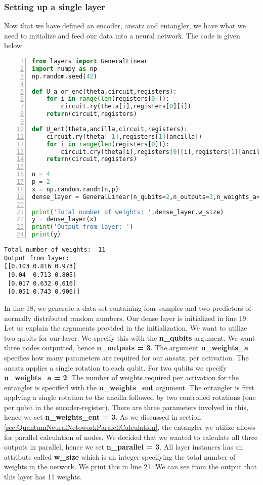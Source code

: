 \subsubsection{Setting up a single layer}
\label{subsubsec:MEthodsSettingUpLayer}
Now that we have defined an encoder, ansatz and entangler, we have what we need to initialize and feed our data into a neural network. The code is given below
\begin{lstlisting}[language=Python,numbers=left]
from layers import GeneralLinear
import numpy as np
np.random.seed(42)

def U_a_or_enc(theta,circuit,registers):
    for i in range(len(registers[0])):
        circuit.ry(theta[i],registers[0][i])
    return(circuit,registers)
    
def U_ent(theta,ancilla,circuit,registers):
    circuit.ry(theta[-1],registers[1][ancilla])
    for i in range(len(registers[0])):
        circuit.cry(theta[i],registers[0][i],registers[1][ancilla])
    return(circuit,registers)

n = 4
p = 2
x = np.random.randn(n,p)
dense_layer = GeneralLinear(n_qubits=2,n_outputs=3,n_weights_a=2,n_weights_ent=3,U_enc=U_a_or_enc,U_a = U_a_or_enc, U_ent=U_ent,n_parallel= 3,seed_simulator=42)

print('Total number of weights: ',dense_layer.w_size)
y = dense_layer(x)
print('Output from layer: ')
print(y)
\end{lstlisting}
\begin{verbatim}
Total number of weights:  11
Output from layer: 
[[0.103 0.816 0.973]
 [0.04  0.713 0.805]
 [0.017 0.632 0.616]
 [0.051 0.743 0.906]]
\end{verbatim}
In line 18, we generate a data set containing four samples and two predictors of normally distributed random numbers. Our dense layer is initialized in line 19. Let us explain the arguments provided in the initialization. We want to utilize two qubits for our layer. We specify this with the \textbf{n\_qubits} argument. We want three nodes outputted, hence \textbf{n\_outputs = 3}. The argument \textbf{n\_weights\_a} specifies how many parameters are required for our ansatz, per activation. The ansatz applies a single rotation to each qubit. For two qubits we specify \textbf{n\_weights\_a = 2}. The number of weights required per activation for the entangler is specified with the \textbf{n\_weights\_ent} argument. The entangler is first applying a single rotation to the ancilla followed by two controlled rotations (one per qubit in the encoder-register). There are three parameters involved in this, hence we set \textbf{n\_weights\_ent = 3}. As we discussed in section \ref{sec:QuantumNeuralNetoworkParalellCalculation}, the entangler we utilize allows for parallel calculation of nodes. We decided that we wanted to calculate all three outputs in parallel, hence we set \textbf{n\_parallel = 3}.
All layer instances has an attribute called \textbf{w\_size} which is an integer specifying the total number of weights in the network. We print this in line 21. We can see from the output that this layer has 11 weights.



